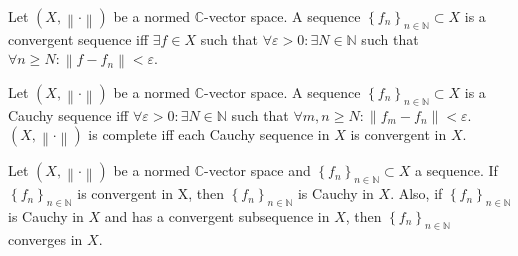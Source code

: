 \begin{frame}
	\begin{definition}
		Let $\left(X,\left\|\cdot\right\|\right)$ be a normed
		$\mathds{C}$-vector space.
		A sequence
		\begin{math}
			\left\{f_{n}\right\}_{n\in\mathds{N}}\subset
			X
		\end{math}
		is a \alert{convergent sequence} iff $\exists f\in X$ such that
		\begin{math}
			\forall\varepsilon>0:
			\exists N\in\mathds{N}
		\end{math}
		such that
		\begin{math}
			\forall n\geq N:
			\left\|f-f_{n}\right\|<
			\varepsilon
		\end{math}.
	\end{definition}

	\begin{definition}
		Let $\left(X,\left\|\cdot\right\|\right)$ be a normed
		$\mathds{C}$-vector space.
		A sequence
		\begin{math}
			\left\{f_{n}\right\}_{n\in\mathds{N}}\subset
			X
		\end{math}
		is a \alert{Cauchy sequence} iff
		\begin{math}
			\forall\varepsilon>0:\exists N\in\mathds{N}
		\end{math}
		such that
		\begin{math}
			\forall m,n\geq N:
			\left\|f_{m}-f_{n}\right\|<\varepsilon
		\end{math}.
		$\left(X,\left\|\cdot\right\|\right)$ is \alert{complete} iff
		each Cauchy sequence in $X$ is convergent in $X$.
	\end{definition}

	\begin{theorem}
		Let $\left(X,\left\|\cdot\right\|\right)$ be a normed
		$\mathds{C}$-vector space and
		${\left\{f_{n}\right\}}_{n\in\mathds{N}}\subset X$ a sequence.
		If
		\begin{math}
			{\left\{f_{n}\right\}}_{n\in\mathds{N}}
		\end{math}
		is convergent in X, then
		\begin{math}
			{\left\{f_{n}\right\}}_{n\in\mathds{N}}
		\end{math}
		is Cauchy in $X$.
		Also, if
		\begin{math}
			{\left\{f_{n}\right\}}_{n\in\mathds{N}}
		\end{math}
		is Cauchy in $X$ and has a
		\alert{convergent subsequence} in $X$, then
		\begin{math}
			{\left\{f_{n}\right\}}_{n\in\mathds{N}}
		\end{math}
		converges in $X$.
	\end{theorem}


\end{frame}
